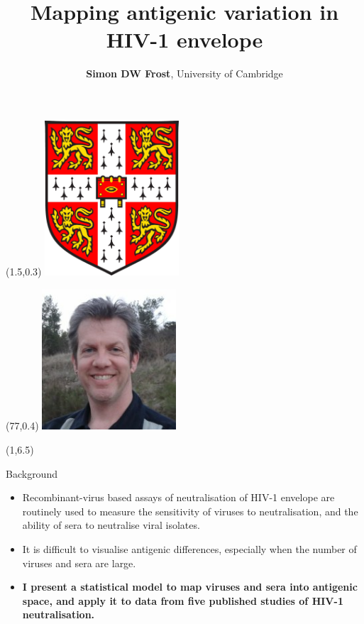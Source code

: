 \documentclass[final]{beamer}
\title{Mapping antigenic variation in HIV-1 envelope}
\author{\textbf{Simon DW Frost}, University of Cambridge}
\date{}
\begin{document}
\nocite{*}
\setlength{\bibitemsep}{4pt plus 2pt}
\setlength{\bibhang}{20pt}

\begin{frame}{} 


\begin{textblock}{9}(1.5,0.3)
\includegraphics[width=5cm]{uc-arms.pdf}
\end{textblock}

\begin{textblock}{6}(77,0.4)
\includegraphics[width=5cm]{image_normal.jpg}
\end{textblock}

\begin{textblock}{40}(1,6.5)
\begin{block}{Background}
\begin{itemize}
\item{Recombinant-virus based assays of neutralisation of HIV-1 envelope are routinely used to measure the sensitivity of viruses to neutralisation, and the ability of sera to neutralise viral isolates.}
\item{It is difficult to visualise antigenic differences, especially when the number of viruses and sera are large.}
\item{\textbf{I present a statistical model to map viruses and sera into antigenic space, and apply it to data from five published studies of HIV-1 neutralisation.}}
\end{itemize}
\end{block}


\end{textblock}
\end{frame}
\end{document}
